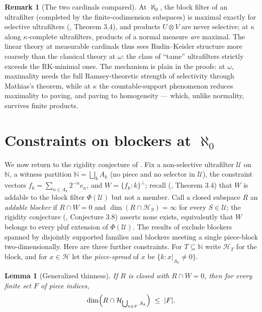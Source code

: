 \documentclass[11pt]{article}
\newtheorem{lemma}[theorem]{Lemma}
\theoremstyle{definition}
\newtheorem{remark}[theorem]{Remark}
\newcommand{\N}{\mathbb{N}}
\newcommand{\HH}{\mathcal{H}}
\newcommand{\U}{\mathcal{U}}
\begin{document}
\begin{remark}[The two cardinals compared]\label{rem:compare}
At $\aleph_0$, the block filter of an ultrafilter (completed by the
finite-codimension subspaces) is maximal exactly for selective
ultrafilters (\cite{FWII}, Theorem 3.4), and products $U\otimes V$ are
never selective; at $\kappa$ along $\kappa$-complete ultrafilters,
products of a normal measure \emph{are} maximal. The linear theory at
measurable cardinals thus sees Rudin--Keisler structure more coarsely
than the classical theory at $\omega$: the class of ``tame''
ultrafilters strictly exceeds the RK-minimal ones. The mechanism is
plain in the proofs: at $\omega$, maximality needs the full
Ramsey-theoretic strength of selectivity through Mathias's theorem,
while at $\kappa$ the countable-support phenomenon reduces maximality to
paving, and paving to homogeneity --- which, unlike normality, survives
finite products.
\end{remark}

\section{Constraints on blockers at $\aleph_0$}\label{sec:rigidity}

We now return to the rigidity conjecture of \cite{FWII}. Fix a
non-selective ultrafilter $\U$ on $\N$, a witness partition
$\N=\bigsqcup_kA_k$ (no piece and no selector in $\U$), the constraint
vectors $f_k=\sum_{n\in A_k}2^{-n}e_n$, and $W=\{f_k:k\}^\perp$; recall
(\cite{FWII}, Theorem 3.4) that $W$ is addable to the block filter
$\Phi(\U)$ but not a member. Call a closed subspace $R$ an \emph{addable
blocker} if $R\cap W=0$ and $\dim(R\cap\HH_S)=\infty$ for every
$S\in\U$; the rigidity conjecture (\cite{FWII}, Conjecture 3.8) asserts
none exists, equivalently that $W$ belongs to every pluf extension of
$\Phi(\U)$. The results of \cite{FWII} exclude blockers spanned by
disjointly supported families and blockers meeting a single piece-block
two-dimensionally. Here are three further constraints. For
$T\subseteq\N$ write $\HH_T$ for the block, and for $x\in\HH$ let the
\emph{piece-spread} of $x$ be $\{k:x|_{A_k}\neq0\}$.

\begin{lemma}[Generalized thinness]\label{lem:genthin}
If $R$ is closed with $R\cap W=0$, then for every finite set $F$ of
piece indices,
\[
\dim\Bigl(R\cap\HH_{\bigcup_{k\in F}A_k}\Bigr)\;\le\;|F|.
\]
\end{lemma}
\end{document}
